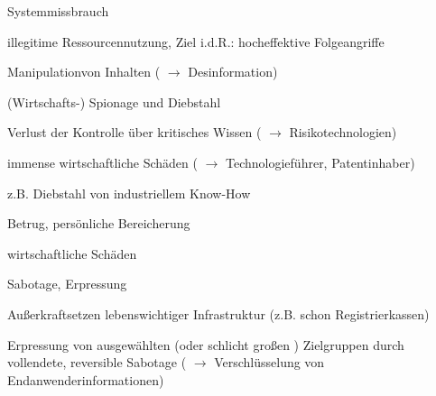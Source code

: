 \documentclass[a4paper]{article}
\begin{document}
\begin{multicols}{3}
    \begin{enumerate*}
        \setcounter{enumi}{1}
        \item
        Systemmissbrauch
    \end{enumerate*}

    \begin{itemize*}
        \item
        illegitime Ressourcennutzung, Ziel i.d.R.: hocheffektive Folgeangriffe
        \item
        Manipulationvon Inhalten ( $\rightarrow$
        Desinformation)
    \end{itemize*}

    \begin{enumerate*}
        \setcounter{enumi}{2}
        \item
              (Wirtschafts-) Spionage und Diebstahl
    \end{enumerate*}

    \begin{itemize*}
        \item
        Verlust der Kontrolle über kritisches Wissen
        ( $\rightarrow$ Risikotechnologien)
        \item
        immense wirtschaftliche Schäden ( $\rightarrow$
        Technologieführer, Patentinhaber)
        \item
        z.B. Diebstahl von industriellem Know-How
    \end{itemize*}

    \begin{enumerate*}
        \setcounter{enumi}{3}
        \item
        Betrug, persönliche Bereicherung
    \end{enumerate*}

    \begin{itemize*}
        \item
        wirtschaftliche Schäden
    \end{itemize*}

    \begin{enumerate*}
        \setcounter{enumi}{4}
        \item
        Sabotage, Erpressung
    \end{enumerate*}

    \begin{itemize*}
        \item
        Außerkraftsetzen lebenswichtiger Infrastruktur (z.B. schon
        Registrierkassen)
        \item
        Erpressung von ausgewählten (oder schlicht großen ) Zielgruppen durch
        vollendete, reversible Sabotage ( $\rightarrow$
        Verschlüsselung von Endanwenderinformationen)
    \end{itemize*}



\end{multicols}
\end{document}
